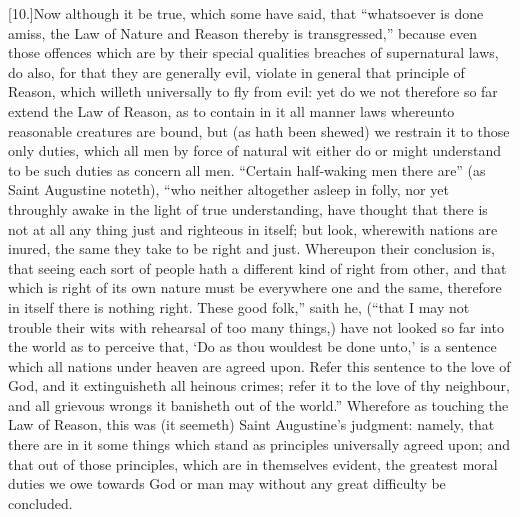 [10.]Now although it be true, which some have said, that “whatsoever is done amiss, the Law of Nature and Reason thereby is transgressed,” because even those offences which are by their special qualities breaches of supernatural laws, do also, for that they are generally evil, violate in general that principle of Reason, which willeth universally to fly from evil: yet do we not therefore so far extend the Law of Reason, as to contain in it all manner laws whereunto reasonable creatures are bound, but (as hath been shewed) we restrain it to those only duties, which all men by force of natural wit either do or might understand to be such duties as concern all men. “Certain half-waking men there are” (as Saint Augustine noteth), “who neither altogether asleep in folly, nor yet throughly awake in the light of true understanding, have thought that there is not at all any thing just and righteous in itself; but look, wherewith nations are inured, the same they take to be right and just. Whereupon their conclusion is, that seeing each sort of people hath a different kind of right from other, and that which is right of its own nature must be everywhere one and the same, therefore in itself there is nothing right. These good folk,” saith he, (“that I may not trouble their wits with rehearsal of too many things,) have not looked so far into the world as to perceive that, ‘Do as thou wouldest be done unto,’ is a sentence which all nations  under heaven are agreed upon. Refer this sentence to the love of God, and it extinguisheth all heinous crimes; refer it to the love of thy neighbour, and all grievous wrongs it banisheth out of the world.” Wherefore as touching the Law of Reason, this was (it seemeth) Saint Augustine’s judgment: namely, that there are in it some things which stand as principles universally agreed upon; and that out of those principles, which are in themselves evident, the greatest moral duties we owe towards God or man may without any great difficulty be concluded.

